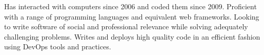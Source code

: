 

\begin{cvparagraph}

Has interacted with computers since 2006 and coded them since 2009. Proficient with a range of programming languages and equivalent web frameworks. Looking to write software of social and professional relevance while solving adequately challenging problems. Writes and deploys high quality code in an efficient fashion using DevOps tools and practices.
\end{cvparagraph}
